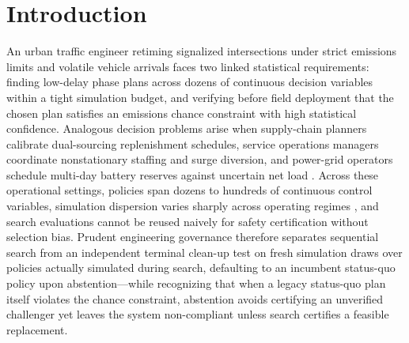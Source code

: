 \section{Introduction}\label{sec:intro}

An urban traffic engineer retiming signalized intersections under strict emissions limits and volatile vehicle arrivals faces two linked statistical requirements: finding low-delay phase plans across dozens of continuous decision variables within a tight simulation budget, and verifying before field deployment that the chosen plan satisfies an emissions chance constraint with high statistical confidence. Analogous decision problems arise when supply-chain planners calibrate dual-sourcing replenishment schedules, service operations managers coordinate nonstationary staffing and surge diversion, and power-grid operators schedule multi-day battery reserves against uncertain net load \citep{boesel2003using,ankenman2010stochastic,hong2011sequential,ault2021reinforcement}. Across these operational settings, policies span dozens to hundreds of continuous control variables, simulation dispersion varies sharply across operating regimes \citep{binois2018practical}, and search evaluations cannot be reused naively for safety certification without selection bias. Prudent engineering governance therefore separates sequential search from an independent terminal clean-up test on fresh simulation draws over policies actually simulated during search, defaulting to an incumbent status-quo policy upon abstention—while recognizing that when a legacy status-quo plan itself violates the chance constraint, abstention avoids certifying an unverified challenger yet leaves the system non-compliant unless search certifies a feasible replacement.

